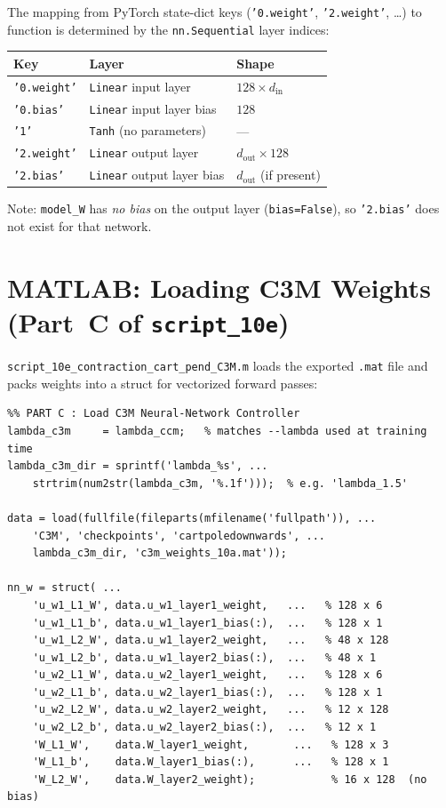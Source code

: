 \documentclass[11pt,a4paper]{article}
\begin{document}
\begin{codemath}
The mapping from PyTorch state-dict keys (\texttt{'0.weight'}, \texttt{'2.weight'}, \ldots) to function is determined by the \texttt{nn.Sequential} layer indices:

\begin{center}
\begin{tabular}{lll}
\toprule
\textbf{Key} & \textbf{Layer} & \textbf{Shape} \\
\midrule
\texttt{'0.weight'} & \texttt{Linear} input layer & \(128 \times d_\mathrm{in}\) \\
\texttt{'0.bias'}   & \texttt{Linear} input layer bias & \(128\) \\
\texttt{'1'}        & \texttt{Tanh} (no parameters) & --- \\
\texttt{'2.weight'} & \texttt{Linear} output layer & \(d_\mathrm{out} \times 128\) \\
\texttt{'2.bias'}   & \texttt{Linear} output layer bias & \(d_\mathrm{out}\) (if present) \\
\bottomrule
\end{tabular}
\end{center}

Note: \texttt{model\_W} has \emph{no bias} on the output layer (\texttt{bias=False}), so \texttt{'2.bias'} does not exist for that network.
\end{codemath}

\section{MATLAB: Loading C3M Weights (Part~C of \texttt{script\_10e})}
\label{sec:c3m_matlab_load}

\texttt{script\_10e\_contraction\_cart\_pend\_C3M.m} loads the exported \texttt{.mat} file and packs weights into a struct for vectorized forward passes:

\begin{lstlisting}
%% PART C : Load C3M Neural-Network Controller
lambda_c3m     = lambda_ccm;   % matches --lambda used at training time
lambda_c3m_dir = sprintf('lambda_%s', ...
    strtrim(num2str(lambda_c3m, '%.1f')));  % e.g. 'lambda_1.5'

data = load(fullfile(fileparts(mfilename('fullpath')), ...
    'C3M', 'checkpoints', 'cartpoledownwards', ...
    lambda_c3m_dir, 'c3m_weights_10a.mat'));

nn_w = struct( ...
    'u_w1_L1_W', data.u_w1_layer1_weight,   ...   % 128 x 6
    'u_w1_L1_b', data.u_w1_layer1_bias(:),  ...   % 128 x 1
    'u_w1_L2_W', data.u_w1_layer2_weight,   ...   % 48 x 128
    'u_w1_L2_b', data.u_w1_layer2_bias(:),  ...   % 48 x 1
    'u_w2_L1_W', data.u_w2_layer1_weight,   ...   % 128 x 6
    'u_w2_L1_b', data.u_w2_layer1_bias(:),  ...   % 128 x 1
    'u_w2_L2_W', data.u_w2_layer2_weight,   ...   % 12 x 128
    'u_w2_L2_b', data.u_w2_layer2_bias(:),  ...   % 12 x 1
    'W_L1_W',    data.W_layer1_weight,       ...   % 128 x 3
    'W_L1_b',    data.W_layer1_bias(:),      ...   % 128 x 1
    'W_L2_W',    data.W_layer2_weight);            % 16 x 128  (no bias)
\end{lstlisting}
\end{document}
